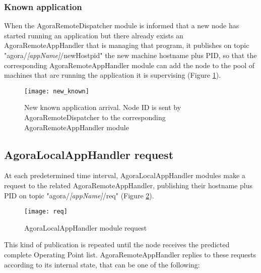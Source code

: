 \subsubsection{Known application}\label{knownApp}

When the AgoraRemoteDispatcher module is informed that a new node has started running an application but there already exists an AgoraRemoteAppHandler that is managing that program, it publishes on topic "agora\slash{}\textit{[app\-Name]}\slash{}newHostpid" the new machine hostname plus PID, so that the corresponding Agora\-Remote\-App\-Handler module can add the node to the pool of machines that are running the application it is supervising (Figure \ref{fig::knownApp}).

\begin{figure}[ht]

    \centering
    \texttt{[image: new\_known]}
    \caption[New known application arrival]{New known application arrival. Node ID is sent by AgoraRemoteDispatcher to the corresponding AgoraRemoteAppHandler module}

    \label{fig::knownApp}
    
\end{figure}





\subsection{AgoraLocalAppHandler request}\label{clientReq}

At each predetermined time interval, AgoraLocalAppHandler modules make a request to the related AgoraRemoteAppHandler, publishing their hostname plus PID on topic "agora/\textit{[appName]}/req" (Figure \ref{fig::localReq}).

\begin{figure}[hb]

    \centering
    \texttt{[image: req]}
    \caption{AgoraLocalAppHandler module request}

    \label{fig::localReq}
    
\end{figure}

This kind of publication is repeated until the node receives the predicted complete Operating Point list. AgoraRemoteAppHandler replies to these requests according to its internal state, that can be one of the following:

